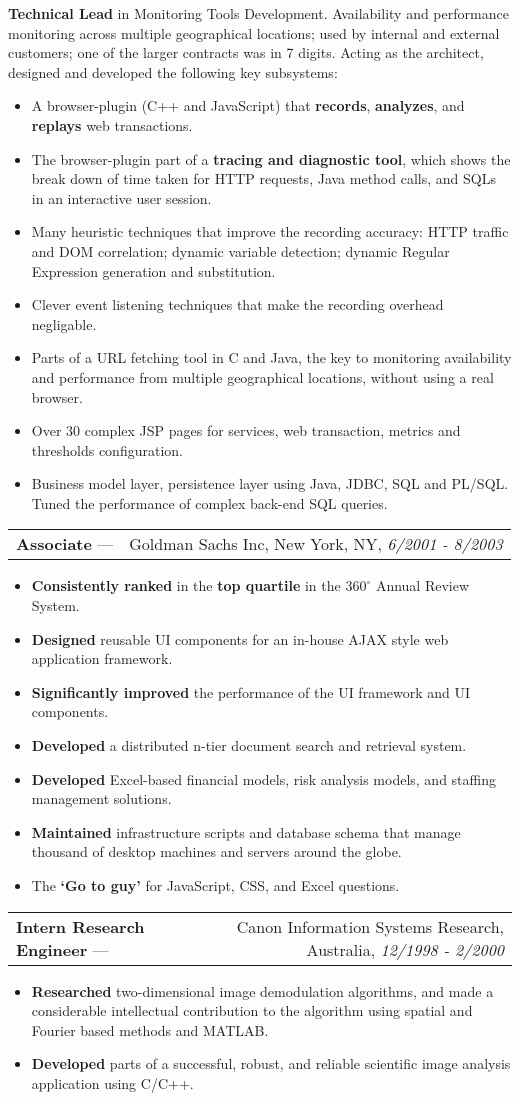 \documentclass[11pt]{article}
\makeatletter
\newcommand{\ressubheading}[4]{\vspace{6pt}
\begin{tabular*}{\textwidth}{@{}l@{\extracolsep{\fill}}r@{}}
\textbf{#1} --- & #3, #2, \textit{#4} \\
\end{tabular*}}
\newcommand{\ressubsubheading}[1]{\vspace{6pt}#1}
\newcommand{\resitem}[1]{\item #1}
\makeatother
\begin{document}
\ressubsubheading{\textbf{Technical Lead} in Monitoring Tools Development. Availability and performance monitoring across multiple geographical locations; used by internal and external customers; one of the larger contracts was in 7 digits. 
Acting as the architect, designed and developed the following key subsystems:}
\begin{itemize}
\resitem{A browser-plugin (C++ and JavaScript) that \textbf{records}, \textbf{analyzes}, and \textbf{replays} web transactions.}
\resitem{The browser-plugin part of a \textbf{tracing and diagnostic tool}, which shows the break down of time taken for HTTP requests, Java method calls, and SQLs in an interactive user session.}
\resitem{Many heuristic techniques that improve the recording accuracy: HTTP traffic and DOM correlation; dynamic variable detection; dynamic Regular Expression generation and substitution.}
\resitem{Clever event listening techniques that make the recording overhead negligable.}
\resitem{Parts of a URL fetching tool in C and Java, the key to monitoring availability and performance from multiple geographical locations, without using a real browser.}
\resitem{Over 30 complex JSP pages for services, web transaction, metrics and thresholds configuration.}
\resitem{Business model layer, persistence layer using Java, JDBC, SQL and PL/SQL. Tuned the performance of complex back-end SQL queries.}
\end{itemize}

\newpage

\ressubheading{Associate}{New York, NY}{Goldman Sachs Inc}{6/2001 - 8/2003}
\begin{itemize}
\resitem{\textbf{Consistently ranked} in the \textbf{top quartile} in the $360^{\circ}$ Annual Review System.}
\resitem{\textbf{Designed} reusable UI components for an in-house AJAX style web application framework.}
\resitem{\textbf{Significantly improved} the performance of the UI framework and UI components.}
\resitem{\textbf{Developed} a distributed n-tier document search and retrieval system.}
\resitem{\textbf{Developed} Excel-based financial models, risk analysis models, and staffing management solutions.}
\resitem{\textbf{Maintained} infrastructure scripts and database schema that manage thousand of desktop machines and
servers around the globe.}
\resitem{The \textbf{`Go to guy'} for JavaScript, CSS, and Excel questions.}
\end{itemize}

\ressubheading{Intern Research Engineer}{Australia}{Canon Information Systems Research}{12/1998 - 2/2000}
\begin{itemize}
\resitem{\textbf{Researched} two-dimensional image demodulation algorithms, and made a considerable intellectual contribution to the algorithm using spatial and Fourier based methods and MATLAB.}
\resitem{\textbf{Developed} parts of a successful, robust, and reliable scientific image analysis application using C/C++.}
\end{itemize}
\end{document}
